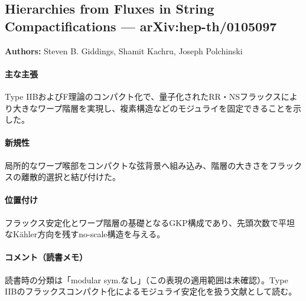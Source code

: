 \subsection{Hierarchies from Fluxes in String Compactifications --- arXiv:hep-th/0105097}

\textbf{Authors:} Steven B. Giddings, Shamit Kachru, Joseph Polchinski

\paragraph{主な主張}
Type IIBおよびF理論のコンパクト化で、量子化されたRR・NSフラックスにより大きなワープ階層を実現し、複素構造などのモジュライを固定できることを示した。 \cite{Giddings:2001yu}

\paragraph{新規性}
局所的なワープ喉部をコンパクトな弦背景へ組み込み、階層の大きさをフラックスの離散的選択と結び付けた。

\paragraph{位置付け}
フラックス安定化とワープ階層の基礎となるGKP構成であり、先頭次数で平坦なK\"ahler方向を残すno-scale構造を与える。

\paragraph{コメント（読書メモ）}
読書時の分類は「modular sym.なし」（この表現の適用範囲は未確認）。Type IIBのフラックスコンパクト化によるモジュライ安定化を扱う文献として読む。
